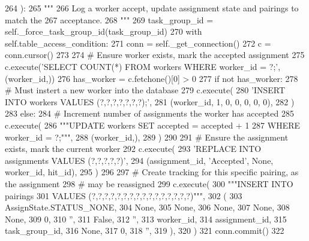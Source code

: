 \begin{DoxyCode}
264     ):
265         \textcolor{stringliteral}{"""}
266 \textcolor{stringliteral}{        Log a worker accept, update assignment state and pairings to match the}
267 \textcolor{stringliteral}{        acceptance.}
268 \textcolor{stringliteral}{        """}
269         task\_group\_id = self.\_force\_task\_group\_id(task\_group\_id)
270         with self.table\_access\_condition:
271             conn = self.\_get\_connection()
272             c = conn.cursor()
273 
274             \textcolor{comment}{# Ensure worker exists, mark the accepted assignment}
275             c.execute(\textcolor{stringliteral}{'SELECT COUNT(*) FROM workers WHERE worker\_id = ?;'}, (worker\_id,))
276             has\_worker = c.fetchone()[0] > 0
277             \textcolor{keywordflow}{if} \textcolor{keywordflow}{not} has\_worker:
278                 \textcolor{comment}{# Must instert a new worker into the database}
279                 c.execute(
280                     \textcolor{stringliteral}{'INSERT INTO workers VALUES (?,?,?,?,?,?,?);'},
281                     (worker\_id, 1, 0, 0, 0, 0, 0),
282                 )
283             \textcolor{keywordflow}{else}:
284                 \textcolor{comment}{# Increment number of assignments the worker has accepted}
285                 c.execute(
286                     \textcolor{stringliteral}{"""UPDATE workers SET accepted = accepted + 1}
287 \textcolor{stringliteral}{                             WHERE worker\_id = ?;"""},
288                     (worker\_id,),
289                 )
290 
291             \textcolor{comment}{# Ensure the assignment exists, mark the current worker}
292             c.execute(
293                 \textcolor{stringliteral}{'REPLACE INTO assignments VALUES (?,?,?,?,?)'},
294                 (assignment\_id, \textcolor{stringliteral}{'Accepted'}, \textcolor{keywordtype}{None}, worker\_id, hit\_id),
295             )
296 
297             \textcolor{comment}{# Create tracking for this specific pairing, as the assignment}
298             \textcolor{comment}{# may be reassigned}
299             c.execute(
300                 \textcolor{stringliteral}{"""INSERT INTO pairings}
301 \textcolor{stringliteral}{                         VALUES (?,?,?,?,?,?,?,?,?,?,?,?,?,?,?,?)"""},
302                 (
303                     AssignState.STATUS\_NONE,
304                     \textcolor{keywordtype}{None},
305                     \textcolor{keywordtype}{None},
306                     \textcolor{keywordtype}{None},
307                     \textcolor{keywordtype}{None},
308                     \textcolor{keywordtype}{None},
309                     0,
310                     \textcolor{stringliteral}{''},
311                     \textcolor{keyword}{False},
312                     \textcolor{stringliteral}{''},
313                     worker\_id,
314                     assignment\_id,
315                     task\_group\_id,
316                     \textcolor{keywordtype}{None},
317                     0,
318                     \textcolor{stringliteral}{''},
319                 ),
320             )
321             conn.commit()
322 
\end{DoxyCode}
